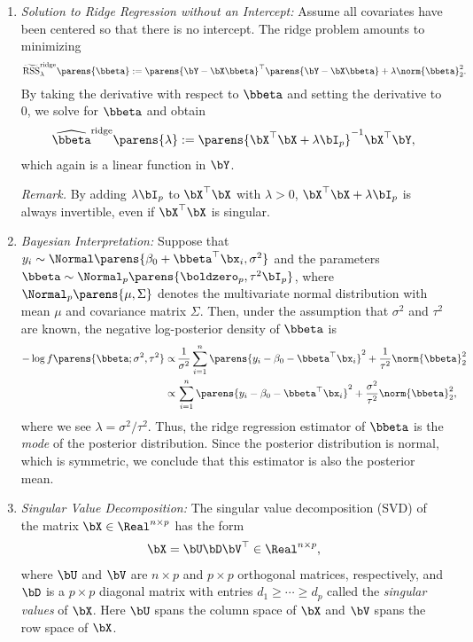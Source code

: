 \documentclass[12pt]{article}
\begin{document}
\begin{enumerate}[label=\textbf{\arabic*.}]
\begin{enumerate}
		\item \textit{Solution to Ridge Regression without an Intercept:} Assume all covariates have been centered so that there is no intercept. The ridge problem amounts to minimizing 
		\begin{align*}
			\widetilde{\text{RSS}}_{\lambda}^{\mathrm{ridge}} \parens{\bbeta} := \parens{\bY - \bX \bbeta}^\top \parens{\bY - \bX \bbeta} + \lambda \norm{\bbeta}_2^2. 
		\end{align*}
		By taking the derivative with respect to $\bbeta$ and setting the derivative to 0, we solve for $\bbeta$ and obtain 
		\begin{align}
			\widehat{\bbeta}^{\mathrm{ridge}} \parens{\lambda} := \parens{\bX^\top \bX + \lambda \bI_p}^{-1} \bX^\top \bY, 
		\end{align}
		which again is a linear function in $\bY$. 
		
		\textit{Remark.} By adding $\lambda \bI_p$ to $\bX^\top \bX$ with $\lambda > 0$, $\bX^\top \bX + \lambda \bI_p$ is always invertible, even if $\bX^\top \bX$ is singular. 
		
		\item \textit{Bayesian Interpretation:} Suppose that $y_i \sim \Normal \parens{\beta_0 + \bbeta^\top \bx_i, \sigma^2}$ and the parameters $\bbeta \sim \Normal_p \parens{\boldzero_p, \tau^2 \bI_p}$, where $\Normal_p \parens{\mu, \Sigma}$ denotes the multivariate normal distribution with mean $\mu$ and covariance matrix $\Sigma$. Then, under the assumption that $\sigma^2$ and $\tau^2$ are known, the negative log-posterior density of $\bbeta$ is 
		\begin{align*}
			- \log f \parens{\bbeta; \sigma^2, \tau^2} \propto & \, \frac{1}{\sigma^2} \sum_{i=1}^n \parens{y_i - \beta_0 - \bbeta^\top \bx_i}^2 + \frac{1}{\tau^2} \norm{\bbeta}_2^2 \\ 
			\propto & \,\sum_{i=1}^n \parens{y_i - \beta_0 - \bbeta^\top \bx_i}^2 + \frac{\sigma^2}{\tau^2} \norm{\bbeta}_2^2, 
		\end{align*} 
		where we see $\lambda = \sigma^2 / \tau^2$. Thus, the ridge regression estimator of $\bbeta$ is the \emph{mode} of the posterior distribution. Since the posterior distribution is normal, which is symmetric, we conclude that this estimator is also the posterior mean. 
		
		\item \textit{Singular Value Decomposition:} The singular value decomposition (SVD) of the matrix $\bX \in \Real^{n \times p}$ has the form 
		\begin{align*}
			\bX = \bU \bD \bV^\top \in \Real^{n \times p}, 
		\end{align*}
		where $\bU$ and $\bV$ are $n \times p$ and $p \times p$ orthogonal matrices, respectively, and $\bD$ is a $p \times p$ diagonal matrix with entries $d_1 \ge \cdots \ge d_p$ called the \emph{singular values} of $\bX$. Here $\bU$ spans the column space of $\bX$ and $\bV$ spans the row space of $\bX$. 
		

\end{enumerate}
\end{enumerate}
\end{document}
